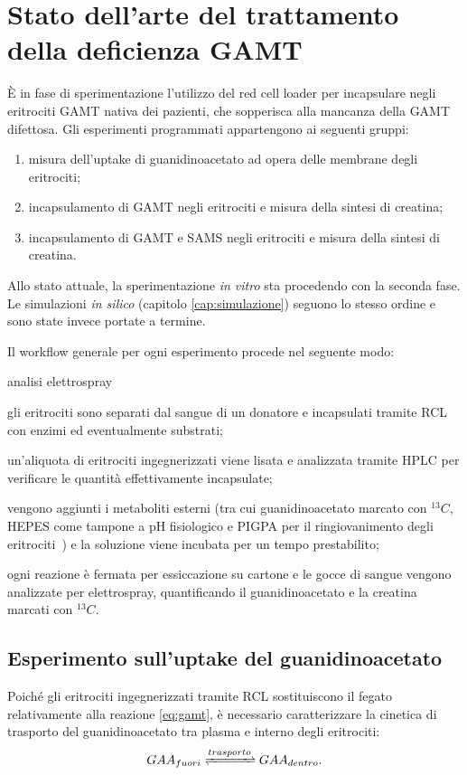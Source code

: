 	\section{Stato dell'arte del trattamento della deficienza GAMT}\label{sez:arte}
	\`E in fase di sperimentazione l'utilizzo del red cell loader per incapsulare negli eritrociti GAMT nativa dei pazienti, che sopperisca alla mancanza della GAMT difettosa.
	Gli esperimenti programmati appartengono ai seguenti gruppi:
	\begin{enumerate}
		\item misura dell'uptake di guanidinoacetato ad opera delle membrane degli eritrociti;
		\item incapsulamento di GAMT negli eritrociti e misura della sintesi di creatina;
		\item incapsulamento di GAMT e SAMS negli eritrociti e misura della sintesi di creatina.
	\end{enumerate}
	
	Allo stato attuale, la sperimentazione \emph{in vitro} sta procedendo con la seconda fase.
	Le simulazioni \emph{in silico} (capitolo \ref{cap:simulazione}) seguono lo stesso ordine e sono state invece portate a termine.

	Il workflow generale per ogni esperimento procede nel seguente modo:
	\begin{labeling}{analisi elettrospray}
		\item [incapsulamento] gli eritrociti sono separati dal sangue di un donatore e incapsulati tramite RCL con enzimi ed eventualmente substrati;
		\item [analisi HPLC] un'aliquota di eritrociti ingegnerizzati viene lisata e analizzata tramite HPLC per verificare le quantit\`a effettivamente incapsulate;
		\item [incubazione] vengono aggiunti i metaboliti esterni (tra cui guanidinoacetato marcato con $^{13}C$, HEPES come tampone a pH fisiologico e PIGPA per il ringiovanimento degli eritrociti~\cite{usry1975morphology}) e la soluzione viene incubata per un tempo prestabilito;
		\item [analisi elettrospray] ogni reazione \`e fermata per essiccazione su cartone e le gocce di sangue vengono analizzate per elettrospray, quantificando il guanidinoacetato e la creatina marcati con $^{13}C$.
	\end{labeling}
	
	\subsection{Esperimento sull'uptake del guanidinoacetato}\label{sez:uptake}
	Poich\'e gli eritrociti ingegnerizzati tramite RCL sostituiscono il fegato relativamente alla reazione \ref{eq:gamt}, \`e necessario caratterizzare la cinetica di trasporto del guanidinoacetato tra plasma e interno degli eritrociti:
	\begin{equation*}
	GAA_{fuori} \xrightleftharpoons{trasporto} GAA_{dentro}.
	\end{equation*}
	
